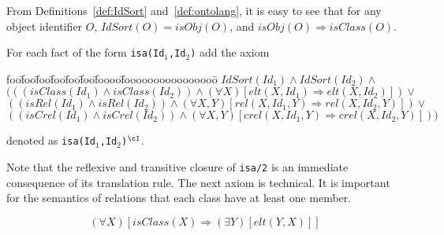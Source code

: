 
From Definitions~\ref{def:IdSort} and~\ref{def:ontolang}, it is easy
to see that for any object identifier $O$, $IdSort(O) = isObj(O)$, and
$isObj(O) \Rightarrow isClass(O)$.

\begin{instance}  \rm 
For each fact of the form {\tt isa(Id$_1$,Id$_2$)} add the axiom
\ \\
\begin{tabbing}
foo\=foo\=foo\=foo\=foo\=foo\=foooo\=foooooooooooooooo\=\kill
\> $ IdSort(Id_1) \wedge IdSort(Id_2) \wedge $ \\

\> \> $ (((isClass(Id_1) \wedge isClass(Id_2)) \wedge
	(\forall X) [elt(X,Id_1) \Rightarrow elt(X,Id_2)]) \vee $ \\


\> \> $ ((isRel(Id_1) \wedge isRel(Id_2)) \wedge
	(\forall X,Y)[rel(X,Id_1,Y) \Rightarrow rel(X,Id_2,Y)]) \vee $ \\

\> \> $ ((isCrel(Id_1) \wedge isCrel(Id_2)) \wedge
	(\forall X,Y)[crel(X,Id_1,Y) \Rightarrow crel(X,Id_2,Y)])) $ 
\end{tabbing}
denoted as {\tt isa(Id$_1$,Id$_2$)}$^{\cI}$.
\end{instance}

Note that the reflexive and transitive closure of {\tt isa/2} is an
immediate consequence of its translation rule.  The next axiom is
technical.  It is important for the semantics of relations that each
class have at least one member.
\begin{axiom} \label{ax:nonnull}
\[ (\forall X) [isClass(X) \Rightarrow (\exists Y) [elt(Y,X)]] \]
\end{axiom} 

